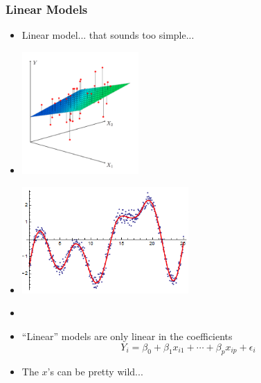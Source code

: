 \documentclass[xcolor={dvipsnames}]{beamer}
\begin{document}
\frame
{
 \frametitle{Linear Models}

\begin{itemize}
\item Linear model... that sounds too simple...
\item<2->[] 
\hspace*{-.25in}\includegraphics[width=1.75in]{stuff/OLS2.png}
\vspace{-1.75in}
\item<3->[] 
\hspace{1.4in}\includegraphics[width=2.5in]{stuff/spline.png} 
\item[] 
\item<4-> ``Linear'' models are only linear in the coefficients
$$Y_i = \beta_0+\beta_1x_{i1} + \cdots + \beta_px_{ip} + \epsilon_i$$
\item<4-> The $x$'s can be pretty wild... 
\end{itemize}

}
\end{document}
